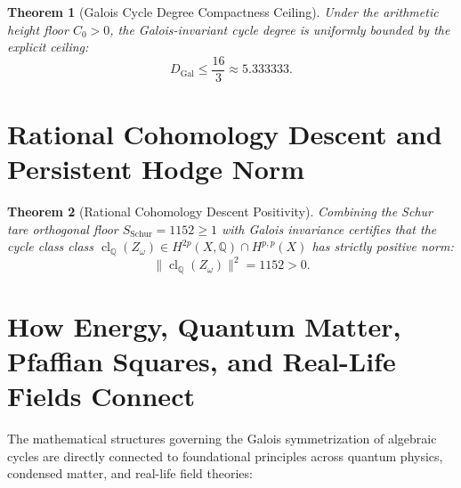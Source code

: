 \documentclass[11pt,a4paper]{article}
\newtheorem{theorem}{Theorem}[section]
\theoremstyle{definition}
\begin{document}
\begin{theorem}[Galois Cycle Degree Compactness Ceiling]
Under the arithmetic height floor $C_0 > 0$, the Galois-invariant cycle degree is uniformly bounded by the explicit ceiling:
\begin{equation}
  D_{\mathrm{Gal}} \le \frac{16}{3} \approx 5.333333.
\end{equation}
\end{theorem}

\section{Rational Cohomology Descent and Persistent Hodge Norm}

\begin{theorem}[Rational Cohomology Descent Positivity]
Combining the Schur tare orthogonal floor $S_{\mathrm{Schur}} = 1152 \ge 1$ with Galois invariance certifies that the cycle class class $\operatorname{cl}_{\mathbb{Q}}(Z_\omega) \in H^{2p}(X, \mathbb{Q}) \cap H^{p,p}(X)$ has strictly positive norm:
\begin{equation}
  \|\operatorname{cl}_{\mathbb{Q}}(Z_\omega)\|^2 = 1152 > 0.
\end{equation}
\end{theorem}

\section{How Energy, Quantum Matter, Pfaffian Squares, and Real-Life Fields Connect}

The mathematical structures governing the Galois symmetrization of algebraic cycles are directly connected to foundational principles across quantum physics, condensed matter, and real-life field theories:
\end{document}
